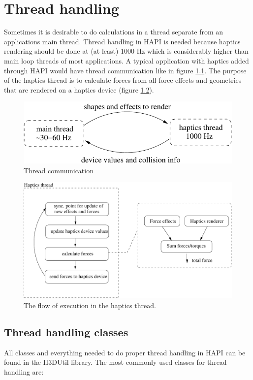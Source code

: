 \chapter{Thread handling}

Sometimes it is desirable to do calculations in a thread separate from an
applications main thread. Thread handling in HAPI is needed because haptics
rendering should be done at (at least) 1000 Hz which is considerably higher
than main loop threads of most applications. A typical application with haptics
added through HAPI would have thread communication like in figure \ref{threads}.
The purpose of the haptics thread is to calculate forces from all force effects
and geometries that are rendered on a haptics device (figure
\ref{haptics thread}).

\begin{figure} 
  \centering 
  \includegraphics{images/threads.pdf}
  \caption{Thread communication}
  \label{threads} 
\end{figure}

\begin{figure} 
  \centering 
  \includegraphics{images/hapticsthread.pdf}
  \caption{The flow of execution in the haptics thread.}
  \label{haptics thread} 
\end{figure}

\section{Thread handling classes}
All classes and everything needed to do proper thread handling in HAPI can be
found in the H3DUtil library. The most commonly used
classes for thread handling are:

